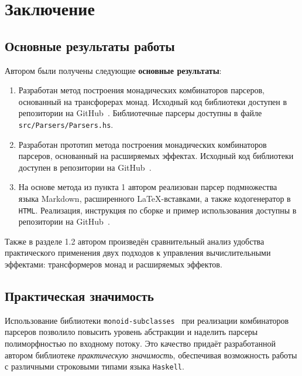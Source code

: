 \chapter{Заключение}

\section{Основные результаты работы} 
  
  Автором были получены следующие \textbf{основные результаты}:

  \begin{enumerate}
    
    \item Разработан метод построения монадических комбинаторов парсеров, основанный 
    на трансфорерах монад. Исходный код библиотеки доступен в репозитории на GitHub~\cite{mdParse}. Библиотечные парсеры доступны в файле \lstinline{src/Parsers/Parsers.hs}. 

    \item Разработан прототип метода построения монадических комбинаторов 
    парсеров, основанный на расширяемых эффектах. Исходный код библиотеки доступен в 
    репозитории на GitHub~\cite{mdParse}. 

    \item На основе метода из пункта 1 автором реализован парсер подмножества языка
    Markdown, расширенного \LaTeX-вставками, а также кодогенератор в 
    \lstinline{HTML}. Реализация, инструкция по сборке и пример использования 
    доступны в репозитории на GitHub~\cite{mdParse}. 
  \end{enumerate}

  Также в разделе 1.2 автором произведён сравнительный анализ удобства 
  практического применения двух подходов к управления вычислительными эффектами: 
  трансформеров монад и расширяемых эффектов. 

\section{Практическая значимость}

  Использование библиотеки \lstinline{monoid-subclasses}~\cite{monoidSubclassesHackage}
  при реализации комбинаторов парсеров  
  позволило повысить уровень абстракции и наделить парсеры 
  полиморфностью по входному потоку. Это качество 
  придаёт разработанной автором библиотеке \emph{практическую значимость}, 
  обеспечивая возможность работы с различными строковыми типами языка \lstinline{Haskell}.  

